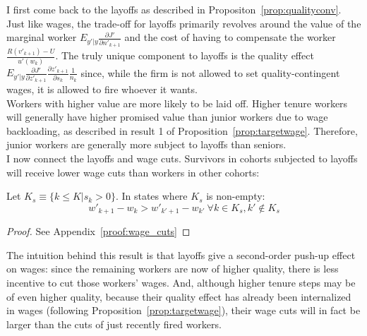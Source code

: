 I first come back to the layoffs as described in Propositon~\ref{prop:qualityconv}.
Just like wages, the trade-off for layoffs primarily revolves around the value of the marginal worker $E_{y'|y}\frac{\partial J'}{\partial n'_{k+1}}$ and the cost of having to compensate the worker $\frac{R(v'_{k+1})-U}{u'(w_k)}$. The truly unique component to layoffs is the quality effect $E_{y'|y}\frac{\partial J'}{\partial z'_{k+1}}\frac{\partial z'_{k+1}}{\partial s_k}\frac{1}{n_k}$ since, while the firm is not allowed to set quality-contingent wages, it is allowed to fire whoever it wants. \\
Workers with higher value are more likely to be laid off. Higher tenure workers will generally have higher promised value than junior workers due to wage backloading, as described in result 1 of Proposition~\ref{prop:targetwage}. Therefore, junior workers are generally more subject to layoffs than seniors.\\
I now connect the layoffs and wage cuts. Survivors in cohorts subjected to layoffs will receive lower wage cuts than workers in other cohorts:
\begin{proposition} \label{prop:wage_cuts}
Let $K_s\equiv \{k\leq K|s_k>0\}$. In states where $K_s$ is non-empty:
  \[w'_{k+1}-w_k>w'_{k'+1}-w_{k'} \: \forall k\in K_s,k'\notin K_s\]
\end{proposition}
\begin{proof}
See Appendix~\ref{proof:wage_cuts}
\end{proof}
The intuition behind this result is that layoffs give a second-order push-up effect on wages: since the remaining workers are now of higher quality, there is less incentive to cut those workers' wages. And, although higher tenure steps may be of even higher quality, because their quality effect has already been internalized in wages (following Proposition~\ref{prop:targetwage}), their wage cuts will in fact be larger than the cuts of just recently fired workers.
